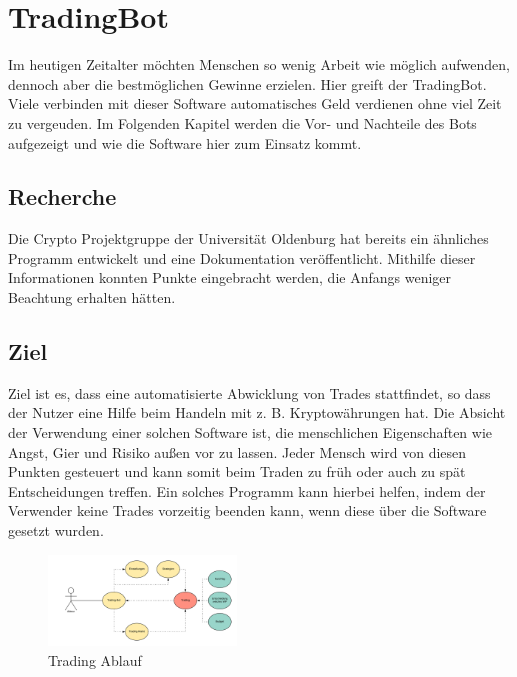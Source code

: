 \section{TradingBot}
Im heutigen Zeitalter möchten Menschen so wenig Arbeit wie möglich aufwenden, dennoch aber die bestmöglichen Gewinne erzielen. Hier greift der TradingBot. Viele verbinden mit dieser Software automatisches Geld verdienen ohne viel Zeit zu vergeuden. Im Folgenden Kapitel werden die Vor- und Nachteile des Bots aufgezeigt und wie die Software hier zum Einsatz kommt. 

\subsection{Recherche}
Die Crypto Projektgruppe der Universität Oldenburg hat bereits ein ähnliches Programm entwickelt und eine Dokumentation veröffentlicht. Mithilfe dieser Informationen konnten Punkte eingebracht werden, die Anfangs weniger Beachtung erhalten hätten.

\subsection{Ziel}
Ziel ist es, dass eine automatisierte Abwicklung von Trades stattfindet, so dass der Nutzer eine Hilfe beim Handeln mit z. B. Kryptowährungen hat. Die Absicht der Verwendung einer solchen Software ist, die menschlichen Eigenschaften wie Angst, Gier und Risiko außen vor zu lassen. Jeder Mensch wird von diesen Punkten gesteuert und kann somit beim Traden zu früh oder auch zu spät Entscheidungen treffen. Ein solches Programm kann hierbei helfen, indem der Verwender keine Trades vorzeitig beenden kann, wenn diese über die Software gesetzt wurden.
\begin{figure}[ht]
\includegraphics[width=5cm]{bot/trading_diagramm}
\caption{Trading Ablauf}
\label{Trading_Diagramm}
\end{figure}

